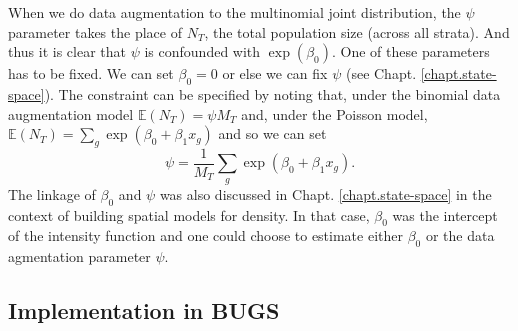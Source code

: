When we do data augmentation to the multinomial joint distribution,
the $\psi$ parameter takes the place of $N_{T}$, the total population
size (across all strata). And thus it is clear that $\psi$ is
confounded with $\exp(\beta_{0})$. 
One of these parameters has to be fixed. We can set
$\beta_0 = 0$ or else we can fix $\psi$ (see Chapt. \ref{chapt.state-space}).  The constraint can be
specified by noting that, under the binomial data augmentation model
$\mathbb{E}(N_{T}) = \psi M_{T}$ and, under the Poisson model,
$\mathbb{E}(N_{T}) = \sum_{g} \exp(\beta_{0} + \beta_{1} x_{g})$ and
so we can set
\[
 \psi = \frac{1}{M_{T}} \sum_{g} \exp(\beta_{0} + \beta_{1} x_{g}).
\]
The linkage of $\beta_{0}$ and $\psi$ was also discussed in
Chapt. \ref{chapt.state-space} in the context of building spatial
models for density. In that case, $\beta_0$ was the intercept of the
intensity function and one could choose to estimate either $\beta_0$
or the data agmentation parameter $\psi$.

\subsection{Implementation in BUGS}

